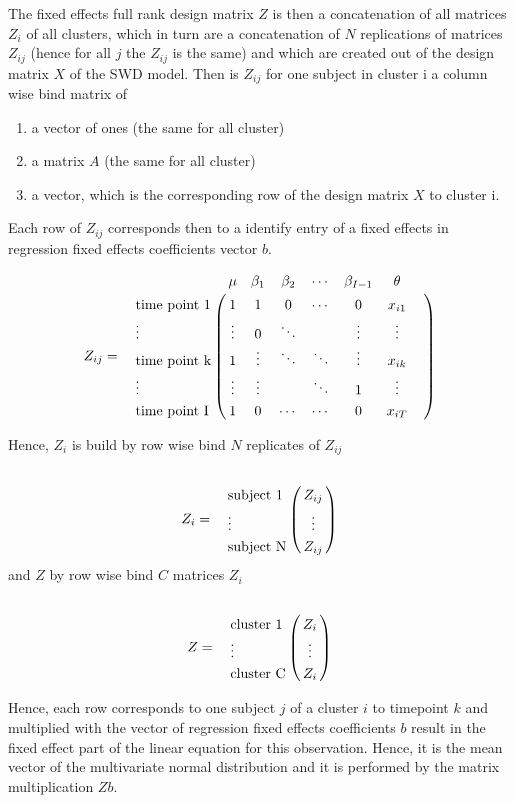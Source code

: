 \documentclass{article}
\begin{document}
The fixed effects full rank design matrix $Z$ is then a concatenation of all matrices $Z_i$ of all clusters, 
which in turn are a concatenation of $N$ replications of matrices $Z_{ij}$ (hence for all $j$ the $Z_{ij}$ is the same) 
and which are created out of the design matrix $X$ of the SWD model.
Then is $Z_{ij}$ for one subject in cluster i a column wise bind matrix of 
\begin{enumerate}
\item a vector of ones (the same for all cluster)
\item a matrix $A$ (the same for all cluster)
\item a vector, which is the corresponding row of the design matrix $X$ to cluster i.
\end{enumerate}
Each row of $Z_{ij}$ corresponds then to a identify entry of a fixed effects in regression fixed effects coefficients vector $b$. 


\begin{eqnarray*}
Z_{ij} &=&  \bordermatrix{
    					& \mu	&\beta_{1}	& \beta_{2}	  & \cdots	& \beta_{I-1}  	&\theta\cr
\textrm{time point 1} 	& 1		& 1			&0		 	& \cdots 	& 0				&x_{i1}\cr
\vdots 					&\vdots &0 			&\ddots	&  			& \vdots 			& \vdots		&\cr
\textrm{time point k}	&1 		&\vdots 	&\ddots	&\ddots 		& \vdots		&x_{ik}\cr
\vdots 					&\vdots &\vdots 	&		&\ddots  		& 1		& \vdots \cr
\textrm{time point I} 	& 1 	& 0 			&\cdots 	&\cdots			&0 				&x_{iT} \cr
}
\end{eqnarray*}

Hence, $Z_i$ is build by row wise bind $N$ replicates of $Z_{ij}$
 \begin{eqnarray*}
Z_{i} &=&\bordermatrix{
    				& \cr
\textrm{subject 1} 	& Z_{ij}\cr
\vdots 	& \vdots      \cr
\textrm{subject N}	&Z_{ij} 		\cr
}
\end{eqnarray*}
and 
$Z$ by row wise bind $C$ matrices $Z_{i}$
 \begin{eqnarray*}
Z &=&\bordermatrix{
  					& \cr
\textrm{cluster 1} 	& Z_{i}\cr
\vdots 	& \vdots      \cr
\textrm{cluster C}	&Z_{i} 		\cr
}
\end{eqnarray*}

Hence, each row corresponds to one subject $j$ of a cluster $i$ to timepoint $k$ and multiplied 
with the vector of regression fixed effects coefficients $b$ result in the fixed effect part of the linear equation for this observation. Hence, it is the mean vector of the multivariate normal distribution and 
it is performed by the matrix multiplication $Zb$.
\end{document}
